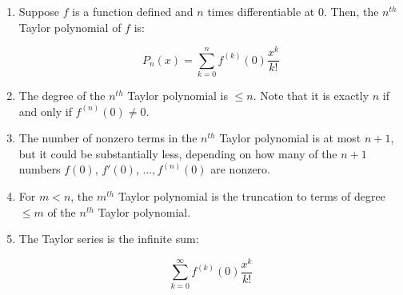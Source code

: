 \documentclass[10pt]{amsart}
\begin{document}
\begin{enumerate}
\item Suppose $f$ is a function defined and $n$ times differentiable
  at $0$. Then, the $n^{th}$ Taylor polynomial of $f$ is:

  $$P_n(x) = \sum_{k=0}^n f^{(k)}(0) \frac{x^k}{k!}$$

\item The degree of the $n^{th}$ Taylor polynomial is $\le n$. Note
  that it is exactly $n$ if and only if $f^{(n)}(0) \ne 0$.
\item The number of nonzero terms in the $n^{th}$ Taylor polynomial is
  at most $n + 1$, but it could be substantially less, depending on
  how many of the $n + 1$ numbers $f(0)$, $f'(0)$, $\dots, f^{(n)}(0)$
  are nonzero.
\item For $m < n$, the $m^{th}$ Taylor polynomial is the truncation to
  terms of degree $\le m$ of the $n^{th}$ Taylor polynomial.
\item The Taylor series is the infinite sum:

  $$\sum_{k=0}^\infty f^{(k)}(0) \frac{x^k}{k!}$$


\end{enumerate}
\end{document}
